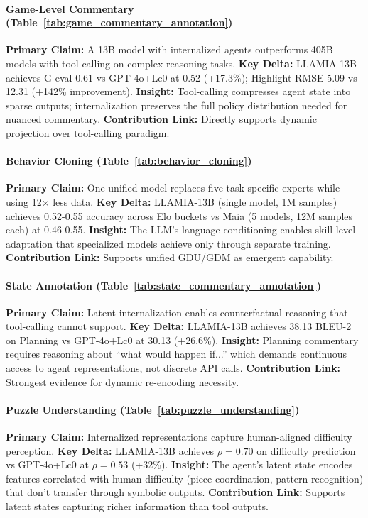 \paragraph{Game-Level Commentary (Table~\ref{tab:game_commentary_annotation})}
\textbf{Primary Claim:} A 13B model with internalized agents outperforms 405B models with tool-calling on complex reasoning tasks.
\textbf{Key Delta:} LLAMIA-13B achieves G-eval 0.61 vs GPT-4o+Lc0 at 0.52 (+17.3\%); Highlight RMSE 5.09 vs 12.31 (+142\% improvement).
\textbf{Insight:} Tool-calling compresses agent state into sparse outputs; internalization preserves the full policy distribution needed for nuanced commentary.
\textbf{Contribution Link:} Directly supports dynamic projection over tool-calling paradigm.

\paragraph{Behavior Cloning (Table~\ref{tab:behavior_cloning})}
\textbf{Primary Claim:} One unified model replaces five task-specific experts while using 12$\times$ less data.
\textbf{Key Delta:} LLAMIA-13B (single model, 1M samples) achieves 0.52-0.55 accuracy across Elo buckets vs Maia (5 models, 12M samples each) at 0.46-0.55.
\textbf{Insight:} The LLM's language conditioning enables skill-level adaptation that specialized models achieve only through separate training.
\textbf{Contribution Link:} Supports unified GDU/GDM as emergent capability.

\paragraph{State Annotation (Table~\ref{tab:state_commentary_annotation})}
\textbf{Primary Claim:} Latent internalization enables counterfactual reasoning that tool-calling cannot support.
\textbf{Key Delta:} LLAMIA-13B achieves 38.13 BLEU-2 on Planning vs GPT-4o+Lc0 at 30.13 (+26.6\%).
\textbf{Insight:} Planning commentary requires reasoning about ``what would happen if...'' which demands continuous access to agent representations, not discrete API calls.
\textbf{Contribution Link:} Strongest evidence for dynamic re-encoding necessity.

\paragraph{Puzzle Understanding (Table~\ref{tab:puzzle_understanding})}
\textbf{Primary Claim:} Internalized representations capture human-aligned difficulty perception.
\textbf{Key Delta:} LLAMIA-13B achieves $\rho=0.70$ on difficulty prediction vs GPT-4o+Lc0 at $\rho=0.53$ (+32\%).
\textbf{Insight:} The agent's latent state encodes features correlated with human difficulty (piece coordination, pattern recognition) that don't transfer through symbolic outputs.
\textbf{Contribution Link:} Supports latent states capturing richer information than tool outputs.

